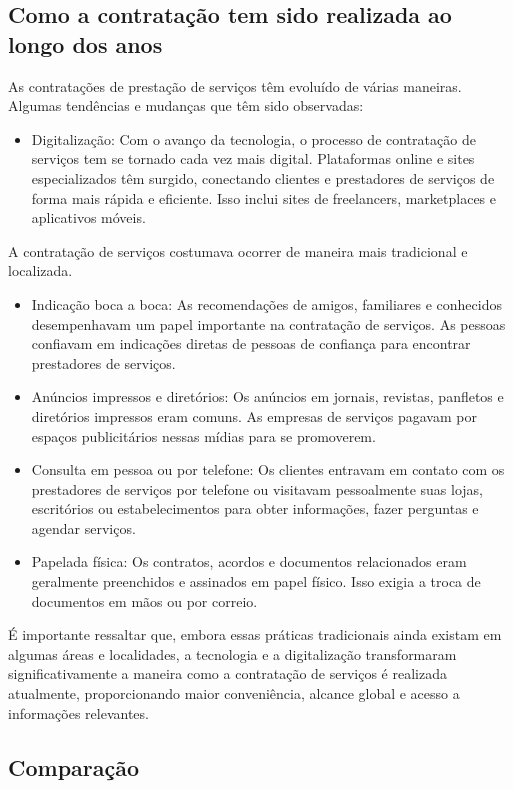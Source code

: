 \subsection{ Como a contratação tem sido realizada ao longo dos anos}
As contratações de prestação de serviços têm evoluído de várias maneiras. Algumas tendências e mudanças que têm sido observadas:
\begin{itemize}[label=$\bullet$]
	\item Digitalização: Com o avanço da tecnologia, o processo de contratação de serviços tem se tornado cada vez mais digital. Plataformas online e sites especializados têm surgido, conectando clientes e prestadores de serviços de forma mais rápida e eficiente. Isso inclui sites de freelancers, marketplaces e aplicativos móveis.
\end{itemize}
A contratação de serviços costumava ocorrer de maneira mais tradicional e localizada.

\begin{itemize}[label=$\bullet$]
	\item Indicação boca a boca: As recomendações de amigos, familiares e conhecidos desempenhavam um papel importante na contratação de serviços. As pessoas confiavam em indicações diretas de pessoas de confiança para encontrar prestadores de serviços.
	\item Anúncios impressos e diretórios: Os anúncios em jornais, revistas, panfletos e diretórios impressos eram comuns. As empresas de serviços pagavam por espaços publicitários nessas mídias para se promoverem.
	\item Consulta em pessoa ou por telefone: Os clientes entravam em contato com os prestadores de serviços por telefone ou visitavam pessoalmente suas lojas, escritórios ou estabelecimentos para obter informações, fazer perguntas e agendar serviços.
	\item Papelada física: Os contratos, acordos e documentos relacionados eram geralmente preenchidos e assinados em papel físico. Isso exigia a troca de documentos em mãos ou por correio.
\end{itemize}
É importante ressaltar que, embora essas práticas tradicionais ainda existam em algumas áreas e localidades, a tecnologia e a digitalização transformaram significativamente a maneira como a contratação de serviços é realizada atualmente, proporcionando maior conveniência, alcance global e acesso a informações relevantes.

\subsection{Comparação}
